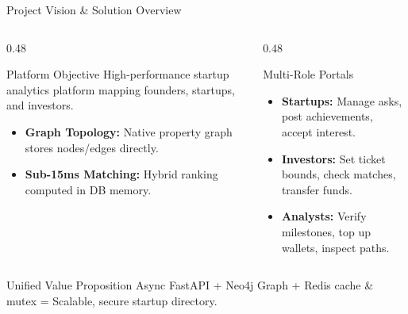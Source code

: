 \documentclass[aspectratio=169, 10pt]{beamer}
\begin{document}
\begin{frame}{Project Vision \& Solution Overview}
  \begin{columns}[T]
    \begin{column}{0.48\textwidth}
      \begin{scard}{Platform Objective}
        High-performance startup analytics platform mapping founders, startups, and investors.
        \begin{itemize}\setlength{\itemsep}{0.5pt}
          \item \textbf{Graph Topology:} Native property graph stores nodes/edges directly.
          \item \textbf{Sub-15ms Matching:} Hybrid ranking computed in DB memory.
        \end{itemize}
      \end{scard}
    \end{column}
    \begin{column}{0.48\textwidth}
      \begin{scard}{Multi-Role Portals}
        \begin{itemize}\setlength{\itemsep}{0.5pt}
          \item \textbf{Startups:} Manage asks, post achievements, accept interest.
          \item \textbf{Investors:} Set ticket bounds, check matches, transfer funds.
          \item \textbf{Analysts:} Verify milestones, top up wallets, inspect paths.
        \end{itemize}
      \end{scard}
    \end{column}
  \end{columns}
  \vspace{1.0mm}
  \begin{successbox}{Unified Value Proposition}
    Async FastAPI + Neo4j Graph + Redis cache \& mutex = Scalable, secure startup directory.
  \end{successbox}
\end{frame}
\end{document}
